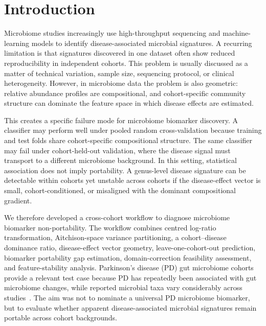 \documentclass[12pt,a4paper]{article}
\begin{document}
\begin{abstract}
\textbf{Conclusions:}
Apparent microbiome biomarker performance can arise from cohort-structured
compositional variation rather than portable disease signal. The proposed
workflow identifies this failure mode by combining compositional geometry,
cohort-held-out prediction, portability-gap estimation, and feature-stability
analysis, and provides a practical validation strategy for microbiome
biomarker studies before candidate signatures are interpreted as
transportable across cohorts.

\noindent\textbf{Keywords:}
microbiome biomarkers; biomarker portability; cohort effects;
compositional data analysis; cross-cohort validation; machine learning;
Aitchison geometry; Parkinson's disease
\end{abstract}

\section{Introduction}
\label{sec:intro}

Microbiome studies increasingly use high-throughput sequencing and
machine-learning models to identify disease-associated microbial signatures.
A recurring limitation is that signatures discovered in one dataset often
show reduced reproducibility in independent cohorts. This problem is usually
discussed as a matter of technical variation, sample size, sequencing
protocol, or clinical heterogeneity. However, in microbiome data the problem
is also geometric: relative abundance profiles are compositional, and
cohort-specific community structure can dominate the feature space in which
disease effects are estimated.

This creates a specific failure mode for microbiome biomarker discovery. A
classifier may perform well under pooled random cross-validation because
training and test folds share cohort-specific compositional structure. The
same classifier may fail under cohort-held-out validation, where the disease
signal must transport to a different microbiome background. In this setting,
statistical association does not imply portability. A genus-level disease
signature can be detectable within cohorts yet unstable across cohorts if the
disease-effect vector is small, cohort-conditioned, or misaligned with the
dominant compositional gradient.

We therefore developed a cross-cohort workflow to diagnose microbiome
biomarker non-portability. The workflow combines centred log-ratio
transformation, Aitchison-space variance partitioning, a cohort--disease
dominance ratio, disease-effect vector geometry, leave-one-cohort-out
prediction, biomarker portability gap estimation, domain-correction
feasibility assessment, and feature-stability analysis. Parkinson's disease
(PD) gut microbiome cohorts provide a relevant test case because PD has
repeatedly been associated with gut microbiome changes, while reported
microbial taxa vary considerably across
studies~\cite{Sampson2016,Bedarf2017,Barichella2019}. The aim was not to
nominate a universal PD microbiome biomarker, but to evaluate whether
apparent disease-associated microbial signatures remain portable across
cohort backgrounds.
\end{document}
